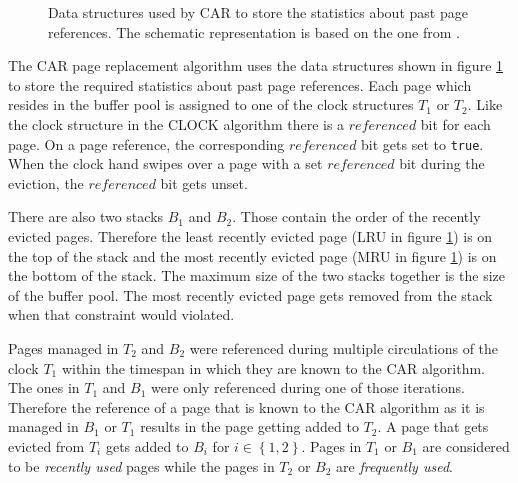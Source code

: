 \begin{@empty}
\begin{figure}[ht!]
{
        }
        \vspace{.25em}
        \caption{Data structures used by CAR to store the statistics about past page references. The schematic representation is based on the one from \cite{Bansal:2004}.}
        \label{fig:datastructures}
    \end{figure}
\end{@empty}

    The CAR page replacement algorithm uses the data structures shown in figure \ref{fig:datastructures} to store the required statistics about past page references. Each page which resides in the buffer pool is assigned to one of the clock structures $T_1$ or $T_2$. Like the clock structure in the CLOCK algorithm there is a $referenced$ bit for each page. On a page reference, the corresponding $referenced$ bit gets set to \lstinline{true}. When the clock hand swipes over a page with a set $referenced$ bit during the eviction, the $referenced$ bit gets unset.

    There are also two stacks $B_1$ and $B_2$. Those contain the order of the recently evicted pages. Therefore the least recently evicted page (LRU in figure \ref{fig:datastructures}) is on the top of the stack and the most recently evicted page (MRU in figure \ref{fig:datastructures}) is on the bottom of the stack. The maximum size of the two stacks together is the size of the buffer pool. The most recently evicted page gets removed from the stack when that constraint would violated.

    Pages managed in $T_2$ and $B_2$ were referenced during multiple circulations of the clock $T_1$ within the timespan in which they are known to the CAR algorithm. The ones in $T_1$ and $B_1$ were only referenced during one of those iterations. Therefore the reference of a page that is known to the CAR algorithm as it is managed in $B_1$ or $T_1$ results in the page getting added to $T_2$. A page that gets evicted from $T_i$ gets added to $B_i$ for $i \in \left\{1, 2\right\}$. Pages in $T_1$ or $B_1$ are considered to be \emph{recently used} pages while the pages in $T_2$ or $B_2$ are \emph{frequently used}.

